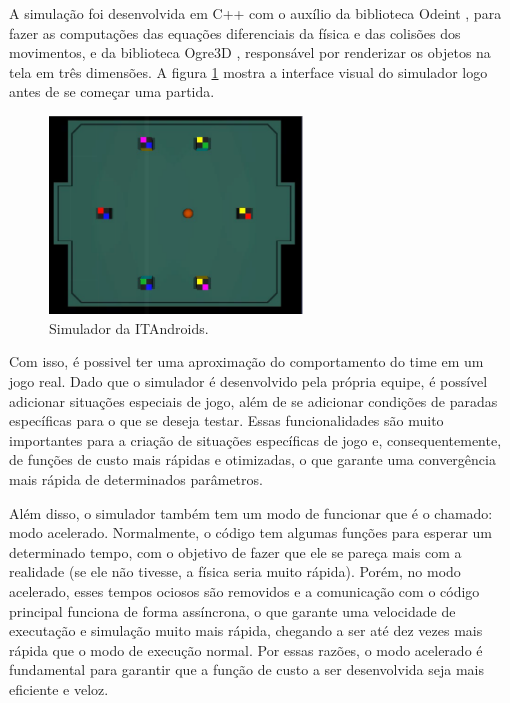 \documentclass[a4paper,12pt]{article}
\begin{document}
A simulação foi desenvolvida em C++ com o auxílio da biblioteca Odeint \cite{ODE}, para fazer as computações das equações diferenciais da física e das colisões dos movimentos, e da biblioteca Ogre3D \cite{Ogre}, responsável por renderizar os objetos na tela em três dimensões. A figura \ref{fig:simulator} mostra a interface visual do simulador logo antes de se começar uma partida.

\begin{figure}[H]
	\centering
	\includegraphics[width=0.6\textwidth]{figures/SimulatorWithoutButtons.png}
	\caption{Simulador da ITAndroids.}
	\label{fig:simulator}
\end{figure}


Com isso, é possivel ter uma aproximação do comportamento do time em um jogo real. Dado que o simulador é desenvolvido pela própria equipe, é possível adicionar situações especiais de jogo, além de se adicionar condições de paradas específicas para o que se deseja testar. Essas funcionalidades são muito importantes para a criação de situações específicas de jogo e, consequentemente, de funções de custo mais rápidas e otimizadas, o que garante uma convergência mais rápida de determinados parâmetros.

Além disso, o simulador também tem um modo de funcionar que é o chamado: modo acelerado. Normalmente, o código tem algumas funções para esperar um determinado tempo, com o objetivo de fazer que ele se pareça mais com a realidade (se ele não tivesse, a física seria muito rápida). Porém, no modo acelerado, esses tempos ociosos são removidos e a comunicação com o código principal funciona de forma assíncrona, o que garante uma velocidade de executação e simulação muito mais rápida, chegando a ser até dez vezes mais rápida que o modo de execução normal. Por essas razões, o modo acelerado é fundamental para garantir que a função de custo a ser desenvolvida seja mais eficiente e veloz.
\end{document}
